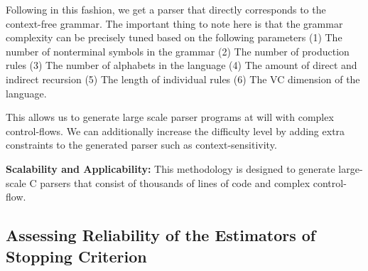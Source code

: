 \documentclass[conference]{IEEEtran}
\begin{document}
Following in this fashion, we get a parser that directly corresponds to the context-free
grammar. The important thing to note here is that the grammar complexity can be
precisely tuned based on the following parameters
(1) The number of nonterminal symbols in the grammar
(2) The number of production rules
(3) The number of alphabets in the language
(4) The amount of direct and indirect recursion
(5) The length of individual rules
(6) The VC dimension of the language.

This allows us to generate large scale parser programs at will with complex control-flows. We can
additionally increase the difficulty level by adding extra constraints to the generated parser such
as context-sensitivity.

\noindent\textbf{Scalability and Applicability:} This methodology is designed to generate large-scale C parsers that consist of thousands of lines of code and complex control-flow.

\subsection{Assessing Reliability of the Estimators of Stopping Criterion}
\end{document}
